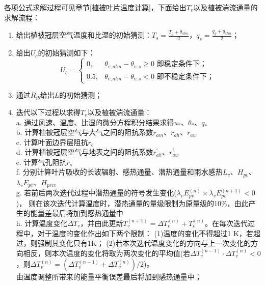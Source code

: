 各项公式求解过程可见章节\ref{植被叶片温度计算}，下面给出$T_v$以及植被湍流通量的求解流程：
\begin{enumerate}
    \item 给出植被冠层空气温度和比湿的初始猜测：$T_s=\frac{T_g+\theta_{atm}}{2}$，$q_s=\frac{q_g+q_{atm}}{2}$；
    \item 给出$U_c$的初始猜测如下：\\
    \begin{equation*}
    U_c= \begin{cases}
      0,  & \theta_{v,atm}-\theta_{v,s}\geq0 \text{ 即稳定条件下；} \\
      0.5, & \theta_{v,atm}-\theta_{v,s}<0 \text{ 即不稳定条件下；}
     \end{cases}
    \end{equation*}
    \item 通过$R_{ib}$给出$L$的初始猜测；
    \item 迭代以下过程以求得$T_v$以及植被湍流通量：\\
    a. 通过风速、温度、比湿的微分方程积分结果求得$u_\ast$、$\theta_\ast$、$q_\ast$ \\
    b. 计算植被冠层空气与大气之间的阻抗系数$r_{am}$、$r_{ah}$、$r_{aw}$ \\
    c. 计算叶面边界层阻抗$r_b$ \\
    d. 计算植被冠层空气与地表之间的阻抗系数$r_{ah}^\prime$、$r_{aw}^\prime$ \\
    e. 计算气孔阻抗$r_s$ \\
    f. 分别计算叶片吸收的长波辐射、感热通量、潜热通量和雨水感热$L_v$、$H_{pv}$、$\lambda_vE_{pv}$、$H_{prcv}$ \\
    g. 若前后两次迭代过程中潜热通量的符号发生变化($\lambda_vE_{pv}^{\left(n\right)}\times\lambda_vE_{pv}^{\left(n+1\right)}<0$)，
    则在该次迭代计算温度时，潜热通量的量级限制为原量级的10\%，由此产生的能量差最后将加到感热通量中 \\
    h. 计算温度变化$\Delta T_v$，并由此更新$T_v^{\left(n+1\right)}=\Delta T_v^{\left(n\right)}+T_v^{\left(n\right)}$。在每次迭代过程中，对于温度的变化作出如下两个限制：
    (1)温度的变化不得超过1 K，若超过，则强制其变化只有1K；
    (2)若本次迭代温度变化的方向与上一次变化的方向相反，则本次温度的变化将取为两次变化的平均值(若$\Delta T_v^{\left(n-1\right)} \cdot \Delta T_v^{\left(n\right)}<0$，则$\Delta T_v^{\left(n\right)}=\left(\Delta T_v^{\left(n-1\right)}+\Delta T_v^{\left(n\right)}\right)/2$)。\\
    由温度调整所带来的能量平衡误差最后将加到感热通量中；\\

\end{enumerate}

